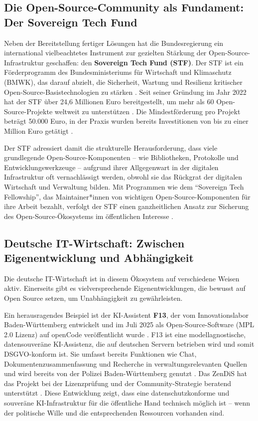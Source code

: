\documentclass[12pt,a4paper]{article}
\begin{document}
	\subsection{Die Open-Source-Community als Fundament: Der Sovereign Tech Fund}
	
	Neben der Bereitstellung fertiger Lösungen hat die Bundesregierung ein international vielbeachtetes Instrument zur gezielten Stärkung der Open-Source-Infrastruktur geschaffen: den \textbf{Sovereign Tech Fund (STF)}. Der STF ist ein Förderprogramm des Bundesministeriums für Wirtschaft und Klimaschutz (BMWK), das darauf abzielt, die Sicherheit, Wartung und Resilienz kritischer Open-Source-Basistechnologien zu stärken \cite{SovereignTechFund2025}. Seit seiner Gründung im Jahr 2022 hat der STF über 24,6 Millionen Euro bereitgestellt, um mehr als 60 Open-Source-Projekte weltweit zu unterstützen \cite{SovereignTechFund2025}. Die Mindestförderung pro Projekt beträgt 50.000 Euro, in der Praxis wurden bereits Investitionen von bis zu einer Million Euro getätigt \cite{SovereignTechFund2025}.
	
	Der STF adressiert damit die strukturelle Herausforderung, dass viele grundlegende Open-Source-Komponenten – wie Bibliotheken, Protokolle und Entwicklungswerkzeuge – aufgrund ihrer Allgegenwart in der digitalen Infrastruktur oft vernachlässigt werden, obwohl sie das Rückgrat der digitalen Wirtschaft und Verwaltung bilden. Mit Programmen wie dem \enquote{Sovereign Tech Fellowship}, das Maintainer*innen von wichtigen Open-Source-Komponenten für ihre Arbeit bezahlt, verfolgt der STF einen ganzheitlichen Ansatz zur Sicherung des Open-Source-Ökosystems im öffentlichen Interesse \cite{STFNews2025}.
	
	\subsection{Deutsche IT-Wirtschaft: Zwischen Eigenentwicklung und Abhängigkeit}
	
	Die deutsche IT-Wirtschaft ist in diesem Ökosystem auf verschiedene Weisen aktiv. Einerseits gibt es vielversprechende Eigenentwicklungen, die bewusst auf Open Source setzen, um Unabhängigkeit zu gewährleisten.
	
	Ein herausragendes Beispiel ist der KI-Assistent \textbf{F13}, der vom Innovationslabor Baden-Württemberg entwickelt und im Juli 2025 als Open-Source-Software (MPL 2.0 Lizenz) auf openCode veröffentlicht wurde \cite{Staatsanzeiger2025}. F13 ist eine modellagnostische, datensouveräne KI-Assistenz, die auf deutschen Servern betrieben wird und somit DSGVO-konform ist. Sie umfasst bereits Funktionen wie Chat, Dokumentenzusammenfassung und Recherche in verwaltungsrelevanten Quellen und wird bereits von der Polizei Baden-Württemberg genutzt \cite{Staatsanzeiger2025}. Das ZenDiS hat das Projekt bei der Lizenzprüfung und der Community-Strategie beratend unterstützt \cite{ZenDiS2025b}. Diese Entwicklung zeigt, dass eine datenschutzkonforme und souveräne KI-Infrastruktur für die öffentliche Hand technisch möglich ist – wenn der politische Wille und die entsprechenden Ressourcen vorhanden sind.
	
\end{document}
